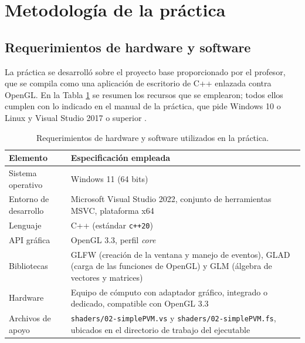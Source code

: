 
\section{Metodología de la práctica}

\subsection{Requerimientos de hardware y software}
La práctica se desarrolló sobre el proyecto base proporcionado por el profesor,
que se compila como una aplicación de escritorio de C++ enlazada contra OpenGL.
En la Tabla \ref{tab:requerimientos} se resumen los recursos que se emplearon;
todos ellos cumplen con lo indicado en el manual de la práctica, que pide
Windows 10 o Linux y Visual Studio 2017 o superior \cite{teodoro_manual02}.

\begin{table}[H]
\centering
\begin{tabular}{@{}p{4.0cm}p{10.5cm}@{}}
\toprule
\textbf{Elemento} & \textbf{Especificación empleada} \\
\midrule
Sistema operativo & Windows 11 (64 bits) \\
Entorno de desarrollo & Microsoft Visual Studio 2022, conjunto de herramientas MSVC, plataforma x64 \\
Lenguaje & C++ (estándar \texttt{c++20}) \\
API gráfica & OpenGL 3.3, perfil \textit{core} \\
Bibliotecas & GLFW (creación de la ventana y manejo de eventos), GLAD (carga de las funciones de OpenGL) y GLM (álgebra de vectores y matrices) \\
Hardware & Equipo de cómputo con adaptador gráfico, integrado o dedicado, compatible con OpenGL 3.3 \\
Archivos de apoyo & \texttt{shaders/02-simplePVM.vs} y \texttt{shaders/02-simplePVM.fs}, ubicados en el directorio de trabajo del ejecutable \\
\bottomrule
\end{tabular}
\caption{Requerimientos de hardware y software utilizados en la práctica.}
\label{tab:requerimientos}
\end{table}

